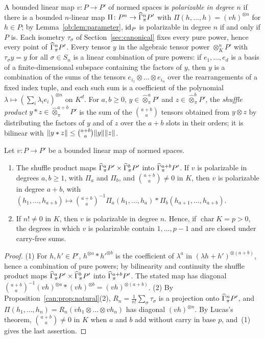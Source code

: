 A bounded linear map $v\colon P\to P'$ of normed spaces is \emph{polarizable in degree $n$} if there is a bounded
$n$-linear map $\Pi\colon P^n\to\widehat\Gamma^n_\pi P'$ with $\Pi(h,\dots,h)=(vh)^{\otimes n}$ for $h\in P$; by
Lemma~\ref{ob:lem:parameter}, $\mathrm{id}_P$ is polarizable in degree $n$ if and only if $P$ is. Each isometry $\tau_\sigma$ of
Section~\ref{sec:canonical} fixes every pure power, hence every point of $\widehat\Gamma^n_\pi P'$. Every tensor $y$ in the
algebraic tensor power $\otimes^n_KP'$ with $\tau_\sigma y=y$ for all $\sigma\in S_n$ is a linear combination of pure
powers: if $e_1,\dots,e_d$ is a basis of a finite-dimensional subspace containing the factors of $y$, then $y$ is a
combination of the sums of the tensors $e_{i_1}\otimes\dots\otimes e_{i_n}$ over the rearrangements of a fixed index tuple,
and each such sum is a coefficient of the polynomial $\lambda\mapsto(\sum_i\lambda_ie_i)^{\otimes n}$ on $K^d$. For
$a,b\ge0$, $y\in\widehat\otimes^a_\pi P'$ and $z\in\widehat\otimes^b_\pi P'$, the \emph{shuffle product}
$y*z\in\widehat\otimes^{a+b}_\pi P'$ is the sum of the $\binom{a+b}a$ tensors obtained from $y\otimes z$ by distributing the
factors of $y$ and of $z$ over the $a+b$ slots in their orders; it is bilinear with
$\lVert y*z\rVert\le\binom{a+b}a\lVert y\rVert\lVert z\rVert$.

\begin{lemma}\label{dgr:lem:polarizable}
Let $v\colon P\to P'$ be a bounded linear map of normed spaces.
\begin{enumerate}
\item The shuffle product maps $\widehat\Gamma^a_\pi P'\times\widehat\Gamma^b_\pi P'$ into $\widehat\Gamma^{a+b}_\pi P'$. If $v$ is polarizable
in degrees $a,b\ge1$, with $\Pi_a$ and $\Pi_b$, and $\binom{a+b}a\ne0$ in $K$, then $v$ is polarizable in degree $a+b$, with
$(h_1,\dots,h_{a+b})\mapsto\binom{a+b}a^{-1}\Pi_a(h_1,\dots,h_a)*\Pi_b(h_{a+1},\dots,h_{a+b})$.
\item If $n!\ne0$ in $K$, then $v$ is polarizable in degree $n$. Hence, if $\operatorname{char}K=p>0$, the degrees in which
$v$ is polarizable contain $1,\dots,p-1$ and are closed under carry-free sums.
\end{enumerate}
\end{lemma}

\begin{proof}
(1) For $h,h'\in P'$, $h^{\otimes a}*h'^{\otimes b}$ is the coefficient of $\lambda^a$ in
$(\lambda h+h')^{\otimes(a+b)}$, hence a combination of pure powers; by bilinearity and continuity the shuffle product maps
$\widehat\Gamma^a_\pi P'\times\widehat\Gamma^b_\pi P'$ into $\widehat\Gamma^{a+b}_\pi P'$. The stated map has diagonal
$\binom{a+b}a^{-1}(vh)^{\otimes a}*(vh)^{\otimes b}=(vh)^{\otimes(a+b)}$. (2) By Proposition~\ref{can:prop:natural}(2),
$R_n=\frac1{n!}\sum_\sigma\tau_\sigma$ is a projection onto $\widehat\Gamma^n_\pi P'$, and
$\Pi(h_1,\dots,h_n)=R_n(vh_1\otimes\dots\otimes vh_n)$ has diagonal $(vh)^{\otimes n}$. By Lucas's theorem,
$\binom{a+b}a\ne0$ in $K$ when $a$ and $b$ add without carry in base $p$, and~(1) gives the last assertion.
\end{proof}

